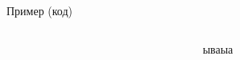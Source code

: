 \documentclass{beamer}
\begin{document}
	\begin{frame}{Пример (код)}

		\begin{columns}
			\begin{column}{0.5\textwidth}




						
			\end{column}
			\begin{column}{0.5\textwidth}
				ываыа
			\end{column}
		\end{columns}

	\end{frame}
	\fi



\end{document}
